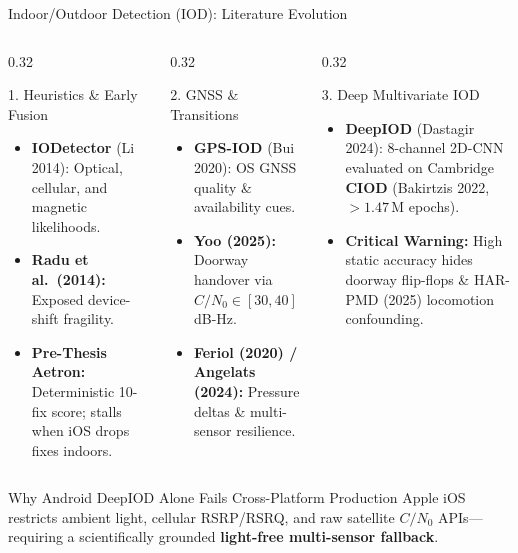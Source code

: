 \documentclass[aspectratio=169,10pt]{beamer}
\begin{document}
\begin{frame}{Indoor/Outdoor Detection (IOD): Literature Evolution}
  \begin{columns}[T]
    \begin{column}{0.32\textwidth}
      \begin{block}{1. Heuristics \& Early Fusion}
        \begin{itemize}\footnotesize
          \item \textbf{IODetector} (Li 2014): Optical, cellular, and magnetic likelihoods.
          \item \textbf{Radu et al.\ (2014):} Exposed device-shift fragility.
          \item \textbf{Pre-Thesis Aetron:} Deterministic 10-fix score; stalls when iOS drops fixes indoors.
        \end{itemize}
      \end{block}
    \end{column}
    \begin{column}{0.32\textwidth}
      \begin{block}{2. GNSS \& Transitions}
        \begin{itemize}\footnotesize
          \item \textbf{GPS-IOD} (Bui 2020): OS GNSS quality \& availability cues.
          \item \textbf{Yoo (2025):} Doorway handover via $C/N_0 \in [30, 40]$\,dB-Hz.
          \item \textbf{Feriol (2020) / Angelats (2024):} Pressure deltas \& multi-sensor resilience.
        \end{itemize}
      \end{block}
    \end{column}
    \begin{column}{0.32\textwidth}
      \begin{block}{3. Deep Multivariate IOD}
        \begin{itemize}\footnotesize
          \item \textbf{DeepIOD} (Dastagir 2024): 8-channel 2D-CNN evaluated on Cambridge \textbf{CIOD} (Bakirtzis 2022, $>1.47$\,M epochs).
          \item \textbf{Critical Warning:} High static accuracy hides doorway flip-flops \& HAR-PMD (2025) locomotion confounding.
        \end{itemize}
      \end{block}
    \end{column}
  \end{columns}
  \vspace{0.25cm}
  \begin{alertblock}{Why Android DeepIOD Alone Fails Cross-Platform Production}
    \small Apple iOS restricts ambient light, cellular RSRP/RSRQ, and raw satellite $C/N_0$ APIs---requiring a scientifically grounded \textbf{light-free multi-sensor fallback}.
  \end{alertblock}
\end{frame}
\end{document}
